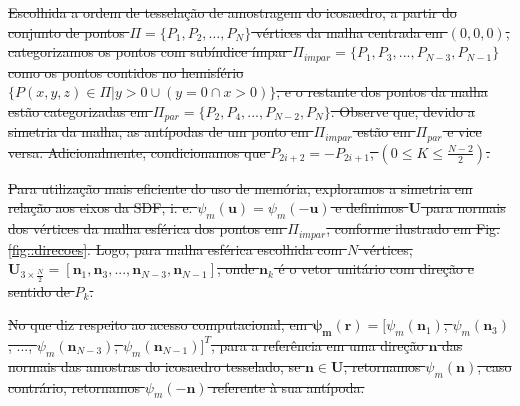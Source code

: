 \documentclass[
    12pt,                %
    oneside,            %
    a4paper,            %
    english,            %
    french,                %
    spanish,            %
    brazil                %
    ]{abntex2}
\begin{document}
\sout{
Escolhida a ordem de tesselação de amostragem do icosaedro, a partir do conjunto de pontos $\Pi = \{P_1, P_2, \dots, P_N\}$ vértices da malha centrada em $(0,0,0)$, categorizamos os pontos com subíndice ímpar $\Pi_{impar} = \{P_1, P_3, ..., P_{N-3}, P_{N-1}\}$ como os pontos contidos no hemisfério $\{P(x, y, z) \in \Pi | y > 0 \cup (y = 0 \cap x > 0)\}$, e o restante dos pontos da malha estão categorizadas em $\Pi_{par} = \{P_2, P_4, ..., P_{N-2}, P_{N}\}$. Observe que, devido a simetria da malha, as antípodas de um ponto em $\Pi_{impar}$ estão em $\Pi_{par}$ e vice versa. Adicionalmente, condicionamos que $P_{2i+2} = -P_{2i+1}$, $(0 \leq K \leq \frac{N-2}{2})$.
}


\sout{
Para utilização mais eficiente do uso de memória, exploramos a simetria em relação aos eixos da SDF, i. e. $\psi_m(\mathbf{u}) = \psi_m(-\mathbf{u})$ e definimos $\mathbf{U}$ para normais dos vértices da malha esférica dos pontos em $\Pi_{impar}$, conforme ilustrado em Fig. \ref{fig::direcoes}. Logo, para malha esférica escolhida com $N$ vértices, $\mathbf{U}_{3\times \frac{N}{2}} = [
\mathbf{n}_1,
\mathbf{n}_3, ..., 
\mathbf{n}_{N-3},
\mathbf{n}_{N-1}
]$, onde $\mathbf{n}_k$ é o vetor unitário com direção e sentido de $P_k$.
}

\sout{
No que diz respeito ao acesso computacional, em $\boldsymbol{\psi_m}(\mathbf{r}) = [
 \psi_m(\mathbf{n}_1    )$,
$\psi_m(\mathbf{n}_3    )$, ..., 
$\psi_m(\mathbf{n}_{N-3})$,
$\psi_m(\mathbf{n}_{N-1})
]^T$, para a referência em uma direção $\mathbf{n}$ das normais das amostras do icosaedro tesselado, se $\mathbf{n} \in \mathbf{U}$, retornamos $\psi_m(\mathbf{n})$, caso contrário, retornamos $\psi_m(-\mathbf{n})$ referente à sua antípoda.
}





\end{document}
